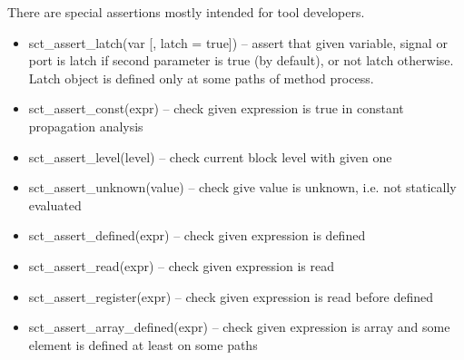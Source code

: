There are special assertions mostly intended for tool developers.
\begin{itemize}
\item sct\_assert\_latch(var [, latch = true]) -- assert that given variable, signal or port is latch if second parameter is true (by default), or not latch otherwise. Latch object is defined only at some paths of method process.
\item sct\_assert\_const(expr) -- check given expression is true in constant propagation analysis
\item sct\_assert\_level(level) -- check current block level with given one
\item sct\_assert\_unknown(value) -- check give value is unknown, i.e. not statically evaluated
\item sct\_assert\_defined(expr) -- check given expression  is defined 
\item sct\_assert\_read(expr) -- check given expression is read 
\item sct\_assert\_register(expr) -- check given expression is read before defined 
\item sct\_assert\_array\_defined(expr) -- check given expression is array and some element is defined at least on some paths
\end{itemize}


